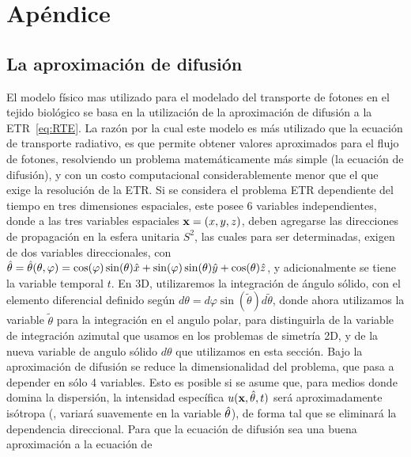 \appendix
\chapter{Apéndice}%
\lhead{\thepage}
\vspace{0.01\textheight}
\section{La aproximación de difusión}
\label{ap:ecdiff}

El modelo físico mas utilizado para el modelado del transporte de fotones en el 
tejido biológico se basa en la utilización de la aproximación de 
difusión a la ETR~\eqref{eq:RTE}. La razón por la cual este modelo es más utilizado 
que la ecuación de transporte radiativo, es que permite obtener valores 
aproximados para el flujo de fotones, resolviendo un problema matemáticamente 
más simple (la ecuación de difusión), y con un costo computacional 
considerablemente menor que el que exige la resolución de la ETR. 
Si se considera el problema ETR dependiente del tiempo 
en tres dimensiones espaciales, 
este posee 6 variables independientes, donde a las tres variables espaciales $\mathbf{x}=(x,y,z)$, 
deben agregarse las direcciones de propagación en la esfera unitaria $S^2$, las 
cuales para ser determinadas, exigen de dos variables direccionales, con $\hat{\theta}=\hat{\theta}(\theta,\varphi)=\cos(\varphi)\sin(\theta)\hat x+\sin(\varphi)\sin(\theta)\hat y+\cos(\theta) \hat z$, y adicionalmente se tiene la variable temporal $t$. En 3D, utilizaremos 
la integración de ángulo sólido, con el elemento diferencial definido según 
$d\theta= d\varphi \sin(\tilde{\theta}) d\tilde{\theta}$, 
donde ahora utilizamos la variable $\tilde{\theta}$ para la integración en el angulo polar, 
para distinguirla de la variable de integración azimutal que usamos en los problemas de simetría 2D, y de la nueva variable de angulo sólido $d\theta$ que utilizamos en esta sección. Bajo la aproximación 
de difusión se reduce la dimensionalidad del problema, que pasa a depender en sólo 4 variables. 
Esto es posible si se asume que, para medios donde domina la dispersión, 
la intensidad específica $u(\mathbf{x},\hat{\theta},t)$ será aproximadamente 
isótropa (\ie, variará suavemente en la variable $\hat{\theta}$), 
de forma tal que se eliminará la dependencia direccional. Para que la 
ecuación de difusión sea una buena aproximación a la ecuación de 
